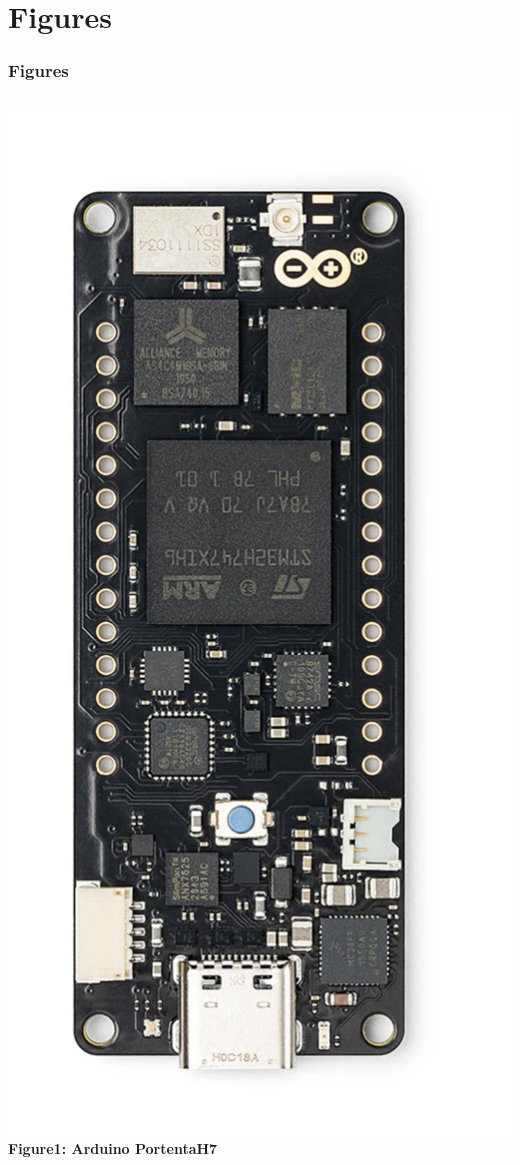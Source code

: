 \documentclass[10pt, a4paper]{beamer}
\begin{document}
	\section{Figures}
	\begin{frame}
		\frametitle{Figures}
		
		\begin{columns}
			\centering
			\includegraphics[width=\textwidth]{images/ArduinoPortentaH7.png}
			\vspace{0.2cm}
			\textbf{Figure1: Arduino PortentaH7}
			

\end{columns}
\end{frame}
\end{document}
